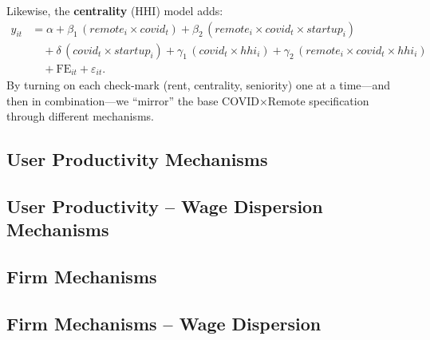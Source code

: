 \documentclass{article}
\newcommand{\cleanedresultsdir}{../results/cleaned}
\begin{document}
Likewise, the \textbf{centrality} (HHI) model adds:
\[
\begin{aligned}
y_{it} &= \alpha 
  + \beta_1\,(remote_i \times covid_t)
  + \beta_2\,(remote_i \times covid_t \times startup_i) \\
       &\quad
  + \delta\,(covid_t \times startup_i)
  + \gamma_1\,(covid_t \times hhi_i)
  + \gamma_2\,(remote_i \times covid_t \times hhi_i) \\
       &\quad
  + \mathrm{FE}_{it}
  + \varepsilon_{it}.
\end{aligned}
\]
By turning on each check‐mark (rent, centrality, seniority) one at a time—and
then in combination—we “mirror” the base COVID×Remote specification through
different mechanisms.



	\clearpage
	\begin{landscape}
	\subsection{User Productivity Mechanisms}
	
	\end{landscape}

\clearpage
\begin{landscape}
\subsection{User Productivity – Wage Dispersion Mechanisms}

\end{landscape}

\clearpage
\begin{landscape}
\subsection{Firm Mechanisms}

\end{landscape}

\clearpage
\begin{landscape}
\subsection{Firm Mechanisms -- Wage Dispersion}

\end{landscape}
\end{document}
